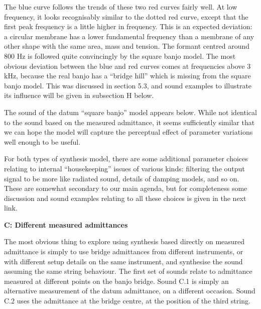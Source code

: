 
  The blue curve follows the trends of these two red curves fairly well. At low 
  frequency, it looks recognisably similar to the dotted red curve, except that 
  the first peak frequency is a little higher in frequency. This is an expected 
  deviation: a circular membrane has a lower fundamental frequency than a 
  membrane of any other shape with the same area, mass and tension. The formant 
  centred around 800 Hz is followed quite convincingly by the square banjo 
  model. The most obvious deviation between the blue and red curves comes at 
  frequencies above 3 kHz, because the real banjo has a ``bridge hill'' which 
  is missing from the square banjo model. This was discussed in section 5.3, 
  and sound examples to illustrate its influence will be given in subsection H 
  below. 

  The sound of the datum ``square banjo'' model appears below. While not 
  identical to the sound based on the measured admittance, it seems 
  sufficiently similar that we can hope the model will capture the perceptual 
  effect of parameter variations well enough to be useful. 


  For both types of synthesis model, there are some additional parameter 
  choices relating to internal ``housekeeping'' issues of various kinds: 
  filtering the output signal to be more like radiated sound, details of 
  damping models, and so on. These are somewhat secondary to our main agenda, 
  but for completeness some discussion and sound examples relating to all these 
  choices is given in the next link. 

  \textbf{C: Different measured admittances} 

  The most obvious thing to explore using synthesis based directly on measured 
  admittance is simply to use bridge admittances from different instruments, or 
  with different setup details on the same instrument, and synthesise the sound 
  assuming the same string behaviour. The first set of sounds relate to 
  admittance measured at different points on the banjo bridge. Sound C.1 is 
  simply an alternative measurement of the datum admittance, on a different 
  occasion. Sound C.2 uses the admittance at the bridge centre, at the position 
  of the third string. 

